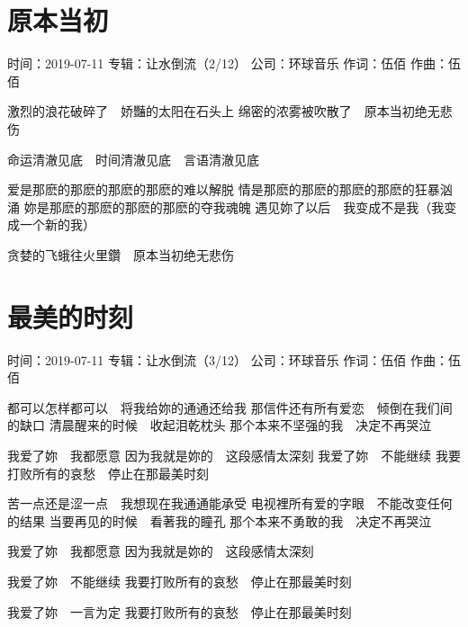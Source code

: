 \documentclass[UTF8,a4paper,oneside,twocolumn,12pt]{ctexbook}
\newcommand{\infopair}[2]{\textbullet #1：#2}
\newcommand{\zc}[1][伍佰]{\infopair{作词}{#1}}
\newcommand{\zq}[1][伍佰]{\infopair{作曲}{#1}}
\newcommand{\zj}[1]{\infopair{专辑}{#1}}
\newcommand{\sj}[1]{\infopair{时间}{#1}}
\newcommand{\gs}[1]{\infopair{公司}{#1}}
\newenvironment{info}{\begin{flushleft}\kaishu
	}
	{\end{flushleft}\normalsize\yahei\par}
\newenvironment{lyric}{
	}
{}
\begin{document}
\section{原本当初}
\begin{info}
	\sj{2019-07-11}
	\zj{让水倒流（2/12）}
	\gs{环球音乐}
	\zc
	\zq
\end{info}
\begin{lyric}
	激烈的浪花破碎了　娇豔的太阳在石头上
	绵密的浓雾被吹散了　原本当初绝无悲伤

	命运清澈见底　时间清澈见底　言语清澈见底

	爱是那麽的那麽的那麽的那麽的难以解脱
	情是那麽的那麽的那麽的那麽的狂暴汹涌
	妳是那麽的那麽的那麽的那麽的夺我魂魄
	遇见妳了以后　我变成不是我（我变成一个新的我）

	贪婪的飞蛾往火里鑽　原本当初绝无悲伤
\end{lyric}

\section{最美的时刻}
\begin{info}
	\sj{2019-07-11}
	\zj{让水倒流（3/12）}
	\gs{环球音乐}
	\zc
	\zq
\end{info}
\begin{lyric}
	都可以怎样都可以　将我给妳的通通还给我
	那信件还有所有爱恋　倾倒在我们间的缺口
	清晨醒来的时候　收起泪乾枕头
	那个本来不坚强的我　决定不再哭泣

	我爱了妳　我都愿意
	因为我就是妳的　这段感情太深刻
	我爱了妳　不能继续
	我要打败所有的哀愁　停止在那最美时刻

	苦一点还是涩一点　我想现在我通通能承受
	电视裡所有爱的字眼　不能改变任何的结果
	当要再见的时候　看著我的瞳孔
	那个本来不勇敢的我　决定不再哭泣

	我爱了妳　我都愿意
	因为我就是妳的　这段感情太深刻

	我爱了妳　不能继续
	我要打败所有的哀愁　停止在那最美时刻

	我爱了妳　一言为定
	我要打败所有的哀愁　停止在那最美时刻
\end{lyric}
\end{document}
